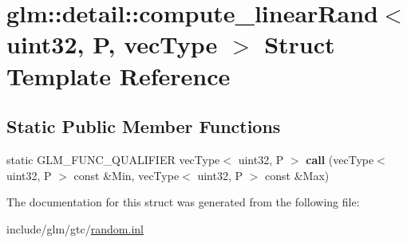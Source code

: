 \hypertarget{structglm_1_1detail_1_1compute__linearRand_3_01uint32_00_01P_00_01vecType_01_4}{}\section{glm\+:\+:detail\+:\+:compute\+\_\+linear\+Rand$<$ uint32, P, vec\+Type $>$ Struct Template Reference}
\label{structglm_1_1detail_1_1compute__linearRand_3_01uint32_00_01P_00_01vecType_01_4}
\subsection*{Static Public Member Functions}
\begin{DoxyCompactItemize}
\item 
\mbox{\label{structglm_1_1detail_1_1compute__linearRand_3_01uint32_00_01P_00_01vecType_01_4_a94f867cad88b72c723b91fb0f8e7e866}} 
static G\+L\+M\+\_\+\+F\+U\+N\+C\+\_\+\+Q\+U\+A\+L\+I\+F\+I\+ER vec\+Type$<$ uint32, P $>$ {\bfseries call} (vec\+Type$<$ uint32, P $>$ const \&Min, vec\+Type$<$ uint32, P $>$ const \&Max)
\end{DoxyCompactItemize}


The documentation for this struct was generated from the following file\+:\begin{DoxyCompactItemize}
\item 
include/glm/gtc/\hyperlink{random_8inl}{random.\+inl}\end{DoxyCompactItemize}
